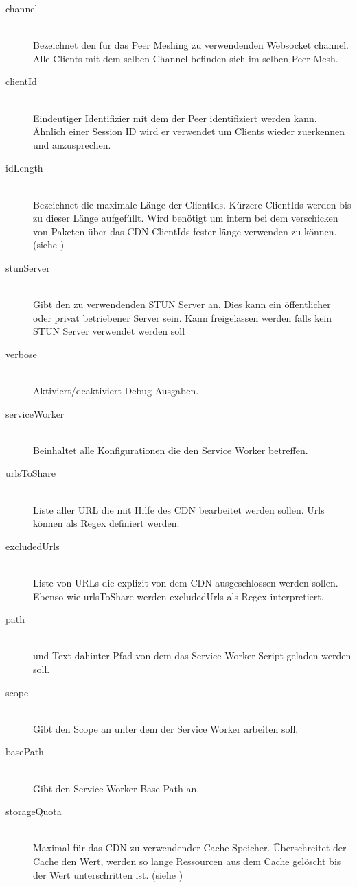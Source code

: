 \begin{description}
\begin{description}
\item[channel]\hfill \\
Bezeichnet den für das Peer Meshing zu verwendenden Websocket channel. Alle Clients mit dem selben Channel befinden sich im selben Peer Mesh.
\item[clientId]\hfill \\
Eindeutiger Identifizier mit dem der Peer identifiziert werden kann. Ähnlich einer Session ID wird er verwendet um Clients wieder zuerkennen und anzusprechen.
\item[idLength]\hfill \\
Bezeichnet die maximale Länge der ClientIds. Kürzere ClientIds werden bis zu dieser Länge aufgefüllt. Wird benötigt um intern bei dem verschicken von Paketen über das CDN ClientIds fester länge verwenden zu können.(siehe ) 
\item[stunServer]\hfill \\
Gibt den zu verwendenden STUN Server an. Dies kann ein öffentlicher oder privat betriebener Server sein. Kann freigelassen werden falls kein STUN Server verwendet werden soll
\item[verbose]\hfill \\
Aktiviert/deaktiviert Debug Ausgaben.
\item[serviceWorker]\hfill \\
Beinhaltet alle Konfigurationen die den Service Worker betreffen.
\item[urlsToShare]\hfill \\
Liste aller URL die mit Hilfe des CDN bearbeitet werden sollen. Urls können als Regex definiert werden.
\item[excludedUrls]\hfill \\
Liste von URLs die explizit von dem CDN ausgeschlossen werden sollen. Ebenso wie urlsToShare werden excludedUrls als Regex interpretiert.
\item[path]\hfill \\ und Text dahinter
Pfad von dem das Service Worker Script geladen werden soll.
\item[scope]\hfill \\
Gibt den Scope an unter dem der Service Worker arbeiten soll. 
\item[basePath]\hfill \\
Gibt den Service Worker Base Path an.
\item[storageQuota]\hfill \\
Maximal für das CDN zu verwendender Cache Speicher. Überschreitet der Cache den Wert, werden so lange Ressourcen aus dem Cache gelöscht bis der Wert unterschritten ist. (siehe ) 

\end{description}
\end{description}
